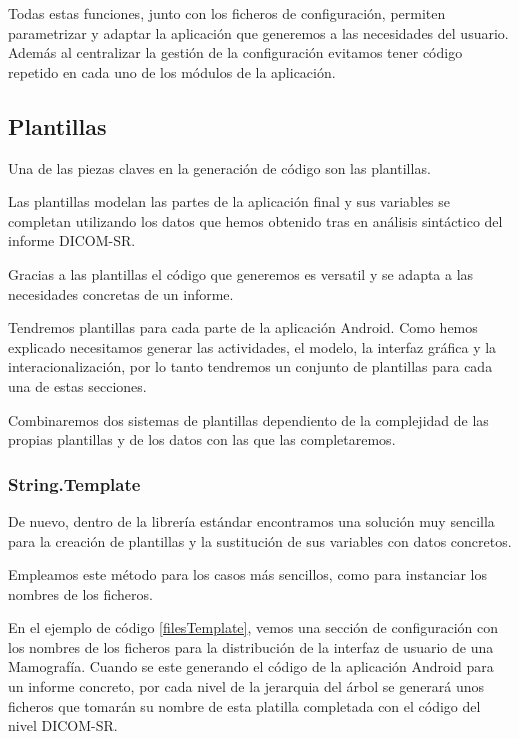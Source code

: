 Todas estas funciones, junto con los ficheros de configuración, permiten parametrizar y adaptar la aplicación que generemos a las necesidades del usuario. Además al centralizar la gestión de la configuración evitamos tener código repetido en cada uno de los módulos de la aplicación.\par

\subsection{Plantillas}\label{sec:templates}
Una de las piezas claves en la generación de código son las plantillas.\par
Las plantillas modelan las partes de la aplicación final y sus variables se completan utilizando los datos que hemos obtenido tras en análisis sintáctico del informe DICOM-SR.\medskip\par

Gracias a las plantillas el código que generemos es versatil y se adapta a las necesidades concretas de un informe. \par
Tendremos plantillas para cada parte de la aplicación Android. Como hemos explicado necesitamos generar las actividades, el modelo, la interfaz gráfica y la interacionalización, por lo tanto tendremos un conjunto de plantillas para cada una de estas secciones.\medskip\par

Combinaremos dos sistemas de plantillas dependiento de la complejidad de las propias plantillas y de los datos con las que las completaremos.\par

\subsubsection{String.Template}
De nuevo, dentro de la librería estándar encontramos una solución muy sencilla para la creación de plantillas y la sustitución de sus variables con datos concretos.\par
Empleamos este método para los casos más sencillos, como para instanciar los nombres de los ficheros.\medskip\par
En el ejemplo de código \ref{filesTemplate}, vemos una sección de configuración con los nombres de los ficheros para la distribución de la interfaz de usuario de una Mamografía. Cuando se este generando el código de la aplicación Android para un informe concreto, por cada nivel de la jerarquia del árbol se generará unos ficheros que tomarán su nombre de esta platilla completada con el código del nivel DICOM-SR.\par


